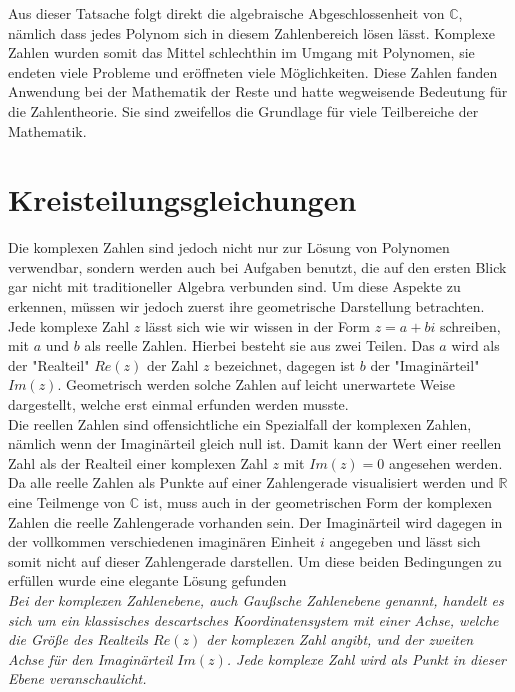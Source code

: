 \documentclass[a4paper,12pt]{article} %
\begin{document}
Aus dieser Tatsache folgt direkt die algebraische Abgeschlossenheit von $\mathbb{C}$, nämlich dass jedes Polynom sich in diesem Zahlenbereich lösen lässt. 
Komplexe Zahlen wurden somit das Mittel schlechthin im Umgang mit Polynomen, sie endeten viele Probleme und eröffneten viele Möglichkeiten.
Diese Zahlen fanden Anwendung bei der Mathematik der Reste und hatte wegweisende Bedeutung für die Zahlentheorie.
Sie sind zweifellos die Grundlage für viele Teilbereiche der Mathematik. 



\section{Kreisteilungsgleichungen}

Die komplexen Zahlen sind jedoch nicht nur zur Lösung von Polynomen verwendbar, sondern werden auch bei Aufgaben benutzt, die auf den ersten Blick gar nicht mit traditioneller Algebra verbunden sind.
Um diese Aspekte zu erkennen, müssen wir jedoch zuerst ihre geometrische Darstellung betrachten.\\

Jede komplexe Zahl $z$ lässt sich wie wir wissen in der Form $z=a+bi$ schreiben, mit $a$ und $b$ als reelle Zahlen.
Hierbei besteht sie aus zwei Teilen.
Das $a$ wird als der "Realteil" $Re(z)$ der Zahl $z$ bezeichnet, dagegen ist $b$ der "{Imaginärteil}" $Im(z)$.
Geometrisch werden solche Zahlen auf leicht unerwartete Weise dargestellt, welche erst einmal erfunden werden musste.\\

Die reellen Zahlen sind offensichtliche ein Spezialfall der komplexen Zahlen, nämlich wenn der Imaginärteil gleich null ist.
Damit kann der Wert einer reellen Zahl als der Realteil einer komplexen Zahl $z$ mit $Im(z)=0$ angesehen werden.
Da alle reelle Zahlen als Punkte auf einer Zahlengerade visualisiert werden und $\mathbb{R}$ eine Teilmenge von $\mathbb{C}$ ist, muss auch in der geometrischen Form der komplexen Zahlen die reelle Zahlengerade vorhanden sein.
Der Imaginärteil wird dagegen in der vollkommen verschiedenen imaginären Einheit $i$ angegeben und lässt sich somit nicht auf dieser Zahlengerade darstellen.
Um diese beiden Bedingungen zu erfüllen wurde eine elegante Lösung gefunden\\


\emph{Bei der komplexen Zahlenebene, auch Gaußsche Zahlenebene genannt, handelt es sich um ein klassisches descartsches Koordinatensystem mit einer Achse, welche die Größe des Realteils $Re(z)$ der komplexen Zahl angibt, und der zweiten Achse für den Imaginärteil $Im(z)$. Jede komplexe Zahl wird als Punkt in dieser Ebene veranschaulicht.}\\
\end{document}
